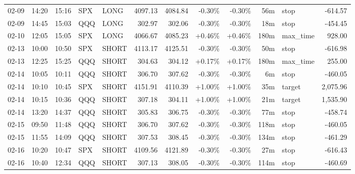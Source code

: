 \documentclass[11pt,a4paper]{article}
\begin{document}
\begin{center}
\begin{longtable}{>{\color{txtmain}}l l l l l r r r r r >{\color{txtmain}}l r}
02-09 & 14:20 & 15:16 & SPX & LONG & 4097.13 & 4084.84 & \textcolor{lossred}{-0.30\%} & \textcolor{lossred}{-0.30\%} & 56m & stop & \textcolor{lossred}{-614.57} \\
02-09 & 14:45 & 15:03 & QQQ & LONG & 302.97 & 302.06 & \textcolor{lossred}{-0.30\%} & \textcolor{lossred}{-0.30\%} & 18m & stop & \textcolor{lossred}{-454.45} \\
02-10 & 12:05 & 15:05 & SPX & LONG & 4066.67 & 4085.23 & \textcolor{wingreen}{+0.46\%} & \textcolor{wingreen}{+0.46\%} & 180m & max\_time & \textcolor{wingreen}{928.00} \\
02-13 & 10:00 & 10:50 & SPX & SHORT & 4113.17 & 4125.51 & \textcolor{lossred}{-0.30\%} & \textcolor{lossred}{-0.30\%} & 50m & stop & \textcolor{lossred}{-616.98} \\
02-13 & 12:25 & 15:25 & QQQ & SHORT & 304.63 & 304.12 & \textcolor{wingreen}{+0.17\%} & \textcolor{wingreen}{+0.17\%} & 180m & max\_time & \textcolor{wingreen}{255.00} \\
02-14 & 10:05 & 10:11 & QQQ & SHORT & 306.70 & 307.62 & \textcolor{lossred}{-0.30\%} & \textcolor{lossred}{-0.30\%} & 6m & stop & \textcolor{lossred}{-460.05} \\
02-14 & 10:10 & 10:45 & SPX & SHORT & 4151.91 & 4110.39 & \textcolor{wingreen}{+1.00\%} & \textcolor{wingreen}{+1.00\%} & 35m & target & \textcolor{wingreen}{2,075.96} \\
02-14 & 10:15 & 10:36 & QQQ & SHORT & 307.18 & 304.11 & \textcolor{wingreen}{+1.00\%} & \textcolor{wingreen}{+1.00\%} & 21m & target & \textcolor{wingreen}{1,535.90} \\
02-14 & 13:20 & 14:37 & QQQ & SHORT & 305.83 & 306.75 & \textcolor{lossred}{-0.30\%} & \textcolor{lossred}{-0.30\%} & 77m & stop & \textcolor{lossred}{-458.74} \\
02-15 & 09:50 & 11:48 & QQQ & SHORT & 306.70 & 307.62 & \textcolor{lossred}{-0.30\%} & \textcolor{lossred}{-0.30\%} & 118m & stop & \textcolor{lossred}{-460.05} \\
02-15 & 11:55 & 14:09 & QQQ & SHORT & 307.53 & 308.45 & \textcolor{lossred}{-0.30\%} & \textcolor{lossred}{-0.30\%} & 134m & stop & \textcolor{lossred}{-461.29} \\
02-16 & 10:20 & 10:47 & SPX & SHORT & 4109.56 & 4121.89 & \textcolor{lossred}{-0.30\%} & \textcolor{lossred}{-0.30\%} & 27m & stop & \textcolor{lossred}{-616.43} \\
02-16 & 10:40 & 12:34 & QQQ & SHORT & 307.13 & 308.05 & \textcolor{lossred}{-0.30\%} & \textcolor{lossred}{-0.30\%} & 114m & stop & \textcolor{lossred}{-460.69} \\

\end{longtable}
\end{center}
\end{document}
